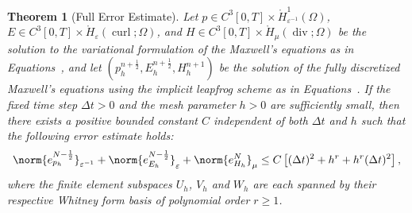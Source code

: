 \documentclass{amsart}
\theoremstyle{thmstyleone}%
\newtheorem{theorem}{Theorem}%
\theoremstyle{thmstyletwo}%
\theoremstyle{thmstylethree}%
\DeclareMathOperator{\curl}{curl}
\def\divgn{\operatorname{div}}
\begin{document}
\begin{theorem}[Full Error Estimate]\label{thm:full_error_estmt_lf}
Let $p \in C^3[0, T] \times \mathring{H}^1_{\varepsilon^{-1}}(\Omega)$, $E \in C^3[0, T] \times \mathring{H}_{\varepsilon}(\curl; \Omega)$, and $H \in C^3[0, T] \times \mathring{H}_{\mu}(\divgn; \Omega)$ be the solution to the variational formulation of the Maxwell's equations as in Equations~, and let $(p_h^{n + \frac{1}{2}}, E_h^{n + \frac{1}{2}}, H_h^{n + 1})$ be the solution of the fully discretized Maxwell's equations using the implicit leapfrog scheme as in Equations~. If the fixed time step $\Delta t > 0$ and the mesh parameter $h > 0$ are sufficiently small, then there exists a positive bounded constant $C$ independent of both $\Delta t$ and $h$ such that the following error estimate holds:
\[
  \norm{e_{p_h}^{N - \frac{1}{2}}}_{\varepsilon^{-1}} + \norm{e_{E_h}^{N - \frac{1}{2}}}_{\varepsilon} + \norm{e_{H_h}^N}_{\mu} \le C \left[ (\Delta t)^2 + h^r + h^r (\Delta t)^2 \right],
\]
where the finite element subspaces $U_h$, $V_h$ and $W_h$ are each spanned by their respective Whitney form basis of polynomial order $r \ge 1$.
\end{theorem}
\end{document}

